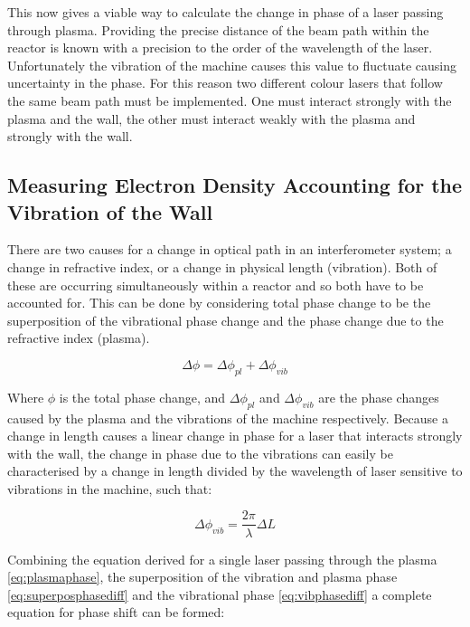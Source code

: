 \documentclass[12pt,a4paper,oneside]{report}
\begin{document}
This now gives a viable way to calculate the change in phase of a laser passing through plasma. Providing the precise distance of the beam path within the reactor is known with a precision to the order of the wavelength of the laser. Unfortunately the vibration of the machine causes this value to fluctuate causing uncertainty in the phase. For this reason two different colour lasers that follow the same beam path must be implemented. One must interact strongly with the plasma and the wall, the other must interact weakly with the plasma and strongly with the wall.
	
    
    \subsection{Measuring Electron Density Accounting for the Vibration of the Wall}
There are two causes for a change in optical path in an interferometer system; a change in refractive index, or a change in physical length (vibration). Both of these are occurring simultaneously within a reactor and so both have to be accounted for. This can be done by considering total phase change to be the superposition of the vibrational phase change and the phase change due to the refractive index (plasma).

\begin{equation}
	\Delta\phi = \Delta\phi_{pl} + \Delta\phi_{vib}
	\label{eq:superposphasediff}
\end{equation}

Where $\phi$ is the total phase change, and $\Delta\phi_{pl}$ and $\Delta\phi_{vib}$ are the phase changes caused by the plasma and the vibrations of the machine respectively. Because a change in length causes a linear change in phase for a laser that interacts strongly with the wall, the change in phase due to the vibrations can easily be characterised by a change in length divided by the wavelength of laser sensitive to vibrations in the machine, such that:

\begin{equation}
	\Delta\phi_{vib} = \frac{2\pi}{\lambda} \Delta L
	\label{eq:vibphasediff}
\end{equation}

Combining the equation derived for a single laser passing through the plasma \ref{eq:plasmaphase}, the superposition of the vibration and plasma phase \ref{eq:superposphasediff} and the vibrational phase \ref{eq:vibphasediff} a complete equation for phase shift can be formed:
\end{document}
